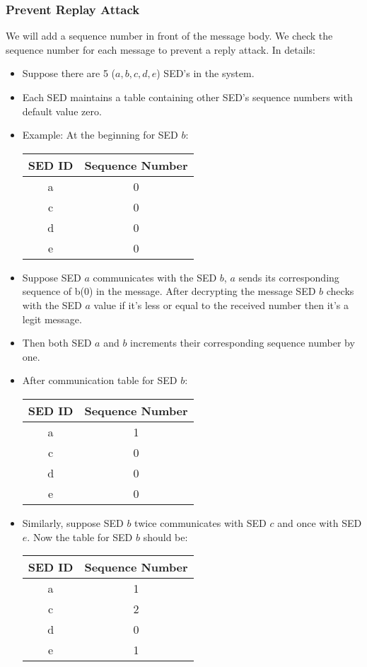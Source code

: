 \documentclass[11pt,oneside,onecolumn,letterpaper]{article}
\begin{document}
  \subsubsection{Prevent Replay Attack}
  We will add a sequence number in front of the message body. We check the sequence number for each message to prevent a reply attack.
  In details:
  \begin{itemize}
  \item Suppose there are 5 ($a, b, c, d, e$) SED's in the system.
  \item Each SED maintains a table containing other SED's sequence numbers with default value zero.
  \item  Example: At the beginning for SED $b$:

    \begin{center}
  \begin{tabular}{ |c|c| } 
   \hline
  \textbf{SED ID} & \textbf{Sequence Number} \\
 	\hline \hline
 	a & 0 \\ 
	c & 0  \\ 
 	d & 0 \\ 
 	e & 0 \\ 
	 \hline
\end{tabular}
\end{center}
  \item Suppose SED $a$ communicates with the SED $b$, $a$ sends its corresponding sequence of b($0$) in the message. After decrypting the message SED $b$ checks with the SED $a$ value if it's less or equal to the received number then it's a legit message. 
  \item Then both SED $a$ and $b$ increments their corresponding sequence number by one.
  \item After communication table for SED $b$:
    \begin{center}
  \begin{tabular}{ |c|c| } 
   \hline
  \textbf{SED ID} & \textbf{Sequence Number} \\
 	\hline \hline
 	a & 1 \\ 
	c & 0  \\ 
 	d & 0 \\ 
 	e & 0 \\ 
	 \hline
\end{tabular}
\end{center}
\item Similarly, suppose SED $b$ twice communicates with SED $c$ and once with SED $e$. Now the table for SED $b$ should be:
   \begin{center}
  \begin{tabular}{ |c|c| } 
   \hline
  \textbf{SED ID} & \textbf{Sequence Number} \\
 	\hline \hline
 	a & 1 \\ 
	c & 2  \\ 
 	d & 0 \\ 
 	e & 1 \\ 
	 \hline
\end{tabular}
\end{center}
    \end{itemize}
\end{document}
